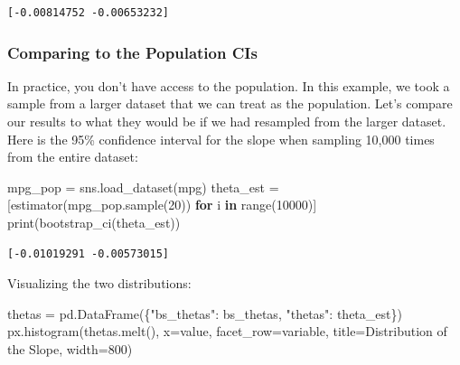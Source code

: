 \documentclass[
  letterpaper,
  DIV=11,
  numbers=noendperiod]{scrreprt}
\newenvironment{Shaded}{\begin{snugshade}}{\end{snugshade}}
\newcommand{\BuiltInTok}[1]{\textcolor[rgb]{0.00,0.23,0.31}{#1}}
\newcommand{\ControlFlowTok}[1]{\textcolor[rgb]{0.00,0.23,0.31}{\textbf{#1}}}
\newcommand{\DecValTok}[1]{\textcolor[rgb]{0.68,0.00,0.00}{#1}}
\newcommand{\KeywordTok}[1]{\textcolor[rgb]{0.00,0.23,0.31}{\textbf{#1}}}
\newcommand{\NormalTok}[1]{\textcolor[rgb]{0.00,0.23,0.31}{#1}}
\newcommand{\OperatorTok}[1]{\textcolor[rgb]{0.37,0.37,0.37}{#1}}
\newcommand{\StringTok}[1]{\textcolor[rgb]{0.13,0.47,0.30}{#1}}
\begin{document}
\begin{verbatim}
[-0.00814752 -0.00653232]
\end{verbatim}

\subsubsection{Comparing to the Population
CIs}\label{comparing-to-the-population-cis}

In practice, you don't have access to the population. In this example,
we took a sample from a larger dataset that we can treat as the
population. Let's compare our results to what they would be if we had
resampled from the larger dataset. Here is the 95\% confidence interval
for the slope when sampling 10,000 times from the entire dataset:

\begin{Shaded}
\begin{Highlighting}[]
\NormalTok{mpg\_pop }\OperatorTok{=}\NormalTok{ sns.load\_dataset(}\StringTok{\textquotesingle{}mpg\textquotesingle{}}\NormalTok{)}
\NormalTok{theta\_est }\OperatorTok{=}\NormalTok{ [estimator(mpg\_pop.sample(}\DecValTok{20}\NormalTok{)) }\ControlFlowTok{for}\NormalTok{ i }\KeywordTok{in} \BuiltInTok{range}\NormalTok{(}\DecValTok{10000}\NormalTok{)]}
\BuiltInTok{print}\NormalTok{(bootstrap\_ci(theta\_est))}
\end{Highlighting}
\end{Shaded}

\begin{verbatim}
[-0.01019291 -0.00573015]
\end{verbatim}

Visualizing the two distributions:

\begin{Shaded}
\begin{Highlighting}[]
\NormalTok{thetas }\OperatorTok{=}\NormalTok{ pd.DataFrame(\{}\StringTok{"bs\_thetas"}\NormalTok{: bs\_thetas, }\StringTok{"thetas"}\NormalTok{: theta\_est\})}
\NormalTok{px.histogram(thetas.melt(), x}\OperatorTok{=}\StringTok{\textquotesingle{}value\textquotesingle{}}\NormalTok{, facet\_row}\OperatorTok{=}\StringTok{\textquotesingle{}variable\textquotesingle{}}\NormalTok{, }
\NormalTok{             title}\OperatorTok{=}\StringTok{\textquotesingle{}Distribution of the Slope\textquotesingle{}}\NormalTok{, width}\OperatorTok{=}\DecValTok{800}\NormalTok{)}
\end{Highlighting}
\end{Shaded}
\end{document}
